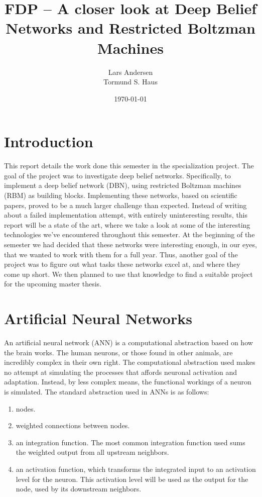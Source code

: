\documentclass[11pt]{article}
\title{FDP -- A closer look at Deep Belief Networks and Restricted Boltzman Machines}
\author{Lars Andersen \\
Tormund S. Haus}
\date{\today}
\begin{document}
\maketitle
\newpage
\tableofcontents

\clearpage
\section{Introduction}

This report details the work done this semester in the specialization project.  The goal of the project was to investigate deep belief networks. Specifically, to implement a deep belief network (DBN), using restricted Boltzman machines (RBM) as building blocks.  Implementing these networks, based on scientific papers, proved to be a much larger challenge than expected.  Instead of writing about a failed implementation attempt, with entirely uninteresting results, this report will be a state of the art, where we take a look at some of the interesting technologies we've encountered throughout this semester.  At the beginning of the semester we had decided that these networks were interesting enough, in our eyes, that we wanted to work with them for a full year.  Thus, another goal of the project was to figure out what tasks these networks excel at, and where they come up short.  We then planned to use that knowledge to find a suitable project for the upcoming master thesis.


\section{Artificial Neural Networks}

An artificial neural network (ANN) is a computational abstraction based on how the brain works.  The human neurons, or those found in other animals, are incredibly complex in their own right.  The computational abstraction used makes no attempt at simulating the processes that affords neuronal activation and adaptation.  Instead, by less complex means, the functional workings of a neuron is simulated.  The standard abstraction used in ANNs is as follows:

\begin{enumerate}
 \item nodes.
 \item weighted connections between nodes.
 \item an integration function.  The most common integration function used sums the weighted output from all upstream neighbors.
 \item an activation function, which transforms the integrated input to an activation level for the neuron.  This activation level will be used as the output for the node, used by its downstream neighbors.
\end{enumerate}
\end{document}
